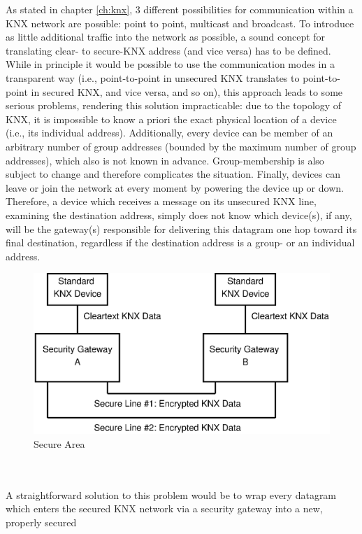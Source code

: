 As stated in chapter \ref{ch:knx}, 3 different possibilities for communication within a KNX network are possible: point to point, multicast and broadcast.
To introduce as little additional traffic into the network as possible, a sound concept for translating clear- to secure-KNX address (and vice versa) has to
be defined. While in principle it would be possible to use the communication modes in a transparent way (i.e., point-to-point in unsecured KNX translates
to point-to-point in secured KNX, and vice versa, and so on), this approach leads to some serious problems, rendering this solution impracticable:
due to the topology of KNX, it is impossible to know a priori the exact physical location of a device (i.e., its individual address). Additionally,
every device can be member of an arbitrary number of group addresses (bounded by the maximum number of group addresses), which also is not known in advance.
Group-membership is also subject to change and therefore complicates the situation. Finally, devices can leave or join the network at every moment by powering the
device up or down.
\\
Therefore, a device which receives a message on its unsecured KNX line, examining the destination address, simply does
not know which device(s), if any, will be the gateway(s) responsible for delivering this datagram one hop toward its final destination, regardless if the destination address
is a group- or an individual address.
\begin{figure}
    \centering
    \includegraphics[width=1\textwidth]{figures/SecureArea.eps}
    \caption{Secure Area}
    \label{fig:secArea}
\end{figure}
\\
\\
A straightforward solution to this problem would be to wrap every datagram which enters the secured KNX network via a security gateway into a new, properly secured
